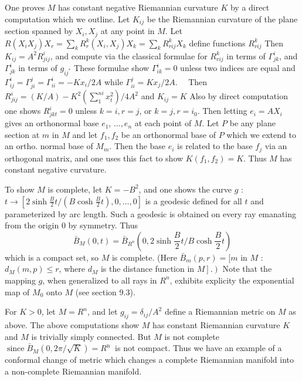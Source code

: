\documentclass[10pt]{article}
\begin{document}
One proves $M$ has constant negative Riemannian curvature $K$ by a direct computation which we outline. Let $K_{i j}$ be the Riemannian curvature of the plane section spanned by $X_{i}, X_{j}$ at any point in $M$. Let $R\left(X_{i} X_{j}\right) X_{r}=\sum_{k} R_{r}^{k}\left(X_{i}, X_{j}\right) X_{k}=\sum_{k} R_{r i j}^{k} X_{k}$ define functions $R_{r i j}^{k}$ Then $K_{i j}=A^{2} R_{j i j}^{i}$, and compute via the classical formulae for $R_{r i j}^{k}$ in terms of $\Gamma_{j k}^{i}$, and $\Gamma_{j k}^{i}$ in terms of $g_{i j^{*}}$ These formulae show $\Gamma_{i k}^{i}=0$ unless two indices are equal and $\Gamma_{i j}^{i}=\Gamma_{j i}^{j}=\Gamma_{i i}^{i}=-K x_{i} / 2 A$ while $\Gamma_{i i}^{j}=K x_{j} / 2 A . \quad$ Then $R_{j i j}^{i}=(K / A)-K^{2}\left(\sum_{1}^{n i} x_{t}^{2}\right) / 4 A^{2}$ and $K_{i j}=K$ Also by direct computation one shows $R_{j k t}^{i}=0$ unless $k=i, r=j$, or $k=j, r=i_{0}$. Then letting $e_{i}=A X_{i}$ gives an orthonormal base $e_{1}$, $\ldots, e_{n}$ at each point of $M$. Let $P$ be any plane section at $m$ in $M$ and let $f_{1}, f_{2}$ be an orthonormal base of $P$ which we extend to an ortho. normal base of $M_{m}$. Then the base $e_{i}$ is related to the base $f_{j}$ via an orthogonal matrix, and one uses this fact to show $K\left(f_{1}, f_{2}\right)=K$. Thus $M$ has constant negative curvature.

To show $M$ is complete, let $K=-B^{2}$, and one shows the curve $g$ : $t \rightarrow\left[2 \sinh \frac{B}{2} t /\left(B \cosh \frac{B}{2} t\right), 0, \ldots, 0\right]$ is a geodesic defined for all $t$ and parameterized by arc length. Such a geodesic is obtained on every ray emanating from the origin 0 by symmetry. Thus
$$
\bar{B}_{M}(0, t)=\bar{B}_{R^{n}}\left(0,2 \sinh \frac{B}{2} t / B \cosh \frac{B}{2} t\right)
$$
which is a compact set, so $M$ is complete. (Here $\bar{B}_{m}(p, r)=[m$ in $M$ : $d_{M}(m, p) \leq r$, where $d_{M}$ is the distance function in $\left.\left.M\right] .\right)$ Note that the mapping $g$, when generalized to all rays in $R^{n}$, exhibits explicity the exponential map of $M_{0}$ onto $M$ (see section 9.3).

For $K>0$, let $M=R^{n}$, and let $g_{i j}=\delta_{i j} / A^{2}$ define a Riemannian metric on $M$ as above. The above computations show $M$ has constant Riemannian curvature $K$ and $M$ is trivially simply connected. But $M$ is not complete $\operatorname{since} \bar{B}_{M}(0,2 \pi / \sqrt{K})=R^{\text {n }}$ is not compact. Thus we have an example of a conformal change of metric which changes a complete Riemannian manifold into a non-complete Riemannian manifold.
\end{document}
